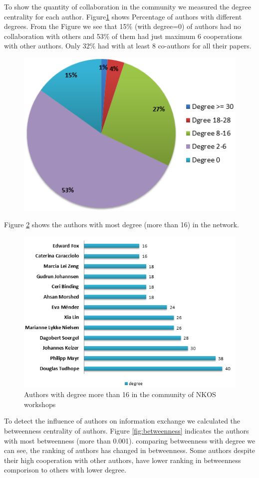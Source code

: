 \documentclass[runningheads,a4paper]{llncs}
\begin{document}
To show the quantity of collaboration in the community we measured the degree centrality for each author. Figure\ref{fig:degreePercentage} shows Percentage of authors with different degrees. From the Figure we see that 15\% (with degree=0) of authors had no collaboration with others and 53\% of them had just maximum 6 cooperations with other authors. Only 32\% had with at least 8 co-authors for all their papers. \\
\begin{figure}[H]
	\centering
	\includegraphics[width=0.7\linewidth]{degreePercentage}
	\caption{}
	\label{fig:degreePercentage}
\end{figure}

Figure \ref{fig:degree16} shows the authors with most degree (more than 16) in the network. \\
\begin{figure}[H]
	\centering
	\includegraphics[width=0.7\linewidth]{degree16}
	\caption{Authors with degree more than 16 in the community of NKOS workshops}
	\label{fig:degree16}
\end{figure}
To detect the influence of authors on information exchange we calculated the betweenness centrality of authors. Figure \ref{fig:betweenness} indicates the authors with most betweenness (more than 0.001). comparing betweenness with degree we can see, the ranking of authors has changed in betweenness. Some authors despite their high cooperation with other authors, have lower ranking in betweenness comporison to others with lower degree. 
\end{document}

